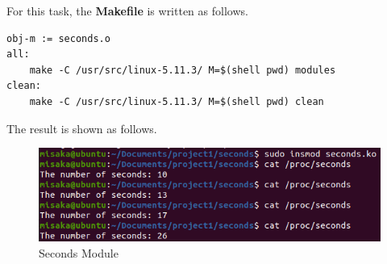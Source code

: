 \documentclass[UTF8,10pt,a4paper]{article}
\theoremstyle{Problem}
\theoremstyle{Solution}
\begin{document}
For this task, the \textbf{Makefile} is written as follows.
\begin{lstlisting}
obj-m := seconds.o
all:
	make -C /usr/src/linux-5.11.3/ M=$(shell pwd) modules
clean:
	make -C /usr/src/linux-5.11.3/ M=$(shell pwd) clean
\end{lstlisting}


The result is shown as follows.
\begin{figure}[H]
    \centering
    \includegraphics[width=380pt]{sec.png}
    \caption{Seconds Module}
    \label{722ds3}
\end{figure}
\end{document}
